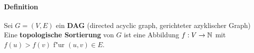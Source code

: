 \paragraph{Definition} Sei $G=(V,E)$ ein \textbf{DAG} (directed acyclic graph, gerichteter azyklischer Graph)\\
Eine \textbf{topologische Sortierung} von $G$ ist eine Abbildung $f:V\rightarrow\mathbb{N}$ mit $f(u)>f(v)$ f"ur $(u,v)\in E$.
